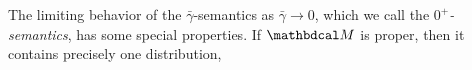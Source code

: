 \documentclass{article}
\newcommand\discard[1]{}
\newcommand\obslimit{observational facet} %
\newcommand\zogamma{{\bar\gamma}}
\newcommand\voli[1]{{\color{olicolor}\textbf{$\boldsymbol\{$Oli: }#1 \textbf{$\boldsymbol\}$}}}
\begin{document}
The limiting behavior of the $\zogamma$-semantics as $\zogamma \to 0$,
which we call the \emph{$0^+$-semantics},
has some special properties.
\discard{Supposing that $\bbeta > \mat 0$,%
    \footnote{or, more generally, that $\bbeta \gg \balpha$,
        (i.e., if $\alpha_a>0$ then $\beta_a>0$), 
        which, for every $\gamma > 0$, is weaker than $\bbeta \ge \gamma \balpha$. }}%
If $\dg M$ is proper, then        
it contains precisely one distribution, 
\end{document}
